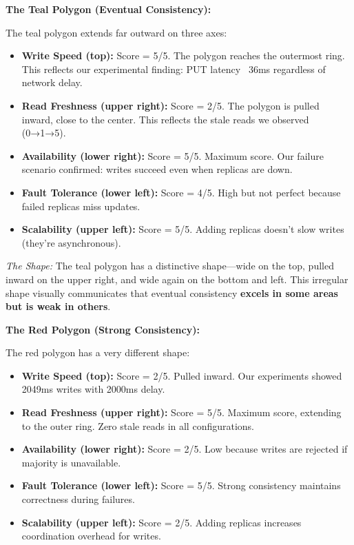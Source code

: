 \documentclass[10pt,a4paper]{article}
\begin{document}
\textbf{The Teal Polygon (Eventual Consistency):}

The teal polygon extends far outward on three axes:
\begin{itemize}
    \item \textbf{Write Speed (top):} Score = 5/5. The polygon reaches the outermost ring. This reflects our experimental finding: PUT latency ~36ms regardless of network delay.
    \item \textbf{Read Freshness (upper right):} Score = 2/5. The polygon is pulled inward, close to the center. This reflects the stale reads we observed (0→1→5).
    \item \textbf{Availability (lower right):} Score = 5/5. Maximum score. Our failure scenario confirmed: writes succeed even when replicas are down.
    \item \textbf{Fault Tolerance (lower left):} Score = 4/5. High but not perfect because failed replicas miss updates.
    \item \textbf{Scalability (upper left):} Score = 5/5. Adding replicas doesn't slow writes (they're asynchronous).
\end{itemize}

\textit{The Shape:} The teal polygon has a distinctive shape---wide on the top, pulled inward on the upper right, and wide again on the bottom and left. This irregular shape visually communicates that eventual consistency \textbf{excels in some areas but is weak in others}.

\textbf{The Red Polygon (Strong Consistency):}

The red polygon has a very different shape:
\begin{itemize}
    \item \textbf{Write Speed (top):} Score = 2/5. Pulled inward. Our experiments showed 2049ms writes with 2000ms delay.
    \item \textbf{Read Freshness (upper right):} Score = 5/5. Maximum score, extending to the outer ring. Zero stale reads in all configurations.
    \item \textbf{Availability (lower right):} Score = 2/5. Low because writes are rejected if majority is unavailable.
    \item \textbf{Fault Tolerance (lower left):} Score = 5/5. Strong consistency maintains correctness during failures.
    \item \textbf{Scalability (upper left):} Score = 2/5. Adding replicas increases coordination overhead for writes.
\end{itemize}
\end{document}

